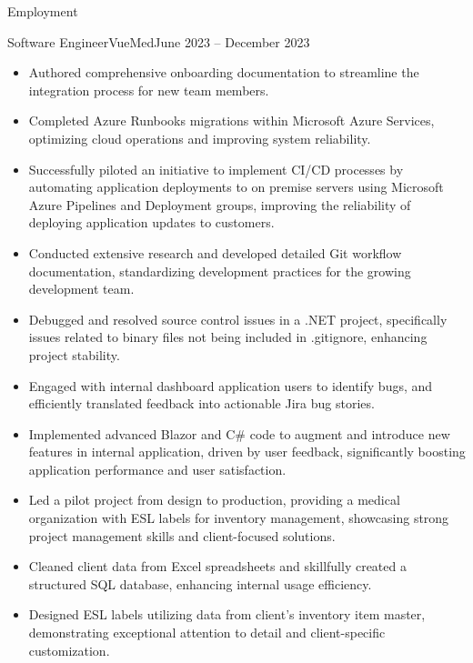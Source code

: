 \documentclass[]{mcdowellcv}
\begin{document}
	\makeheader
	
	\begin{cvsection}{Employment}
		\begin{cvsubsection}{Software Engineer}{VueMed}{June 2023 -- December 2023}			
			\begin{itemize}
				\item Authored comprehensive onboarding documentation to streamline the integration process for new team members.
				\item Completed Azure Runbooks migrations within Microsoft Azure Services, optimizing cloud operations and improving system reliability.
				\item Successfully piloted an initiative to implement CI/CD processes by automating application deployments to on premise servers using Microsoft Azure Pipelines and Deployment groups, improving the reliability of deploying application updates to customers. 
				\item Conducted extensive research and developed detailed Git workflow documentation, standardizing development practices for the growing development team.
				\item Debugged and resolved source control issues in a .NET project, specifically issues related to binary files not being included in .gitignore, enhancing project stability.
				\item Engaged with internal dashboard application users to identify bugs, and efficiently translated feedback into actionable Jira bug stories.
				\item Implemented advanced Blazor and C# code to augment and introduce new features in internal application, driven by user feedback, significantly boosting application performance and user satisfaction.
				\item Led a pilot project from design to production, providing a medical organization with ESL labels for inventory management, showcasing strong project management skills and client-focused solutions.
				\item Cleaned client data from Excel spreadsheets and skillfully created a structured SQL database, enhancing internal usage efficiency. 
				\item Designed ESL labels utilizing data from client's inventory item master, demonstrating exceptional attention to detail and client-specific customization.
			\end{itemize}
		\end{cvsubsection}
		

\end{cvsection}
\end{document}

